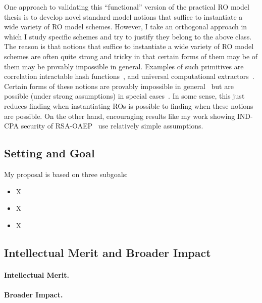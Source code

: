 One approach to validating this ``functional'' version of the practical RO model thesis is to develop novel standard model notions that suffice to instantiate a wide variety of RO model schemes. However, I take an orthogonal approach in which I study  specific  schemes and try to justify they belong to the above class.  The reason is that notions that suffice to instantiate a wide variety of RO model schemes are often quite strong and tricky in that certain forms of them may be of them may be provably impossible in general.  Examples of such primitives are correlation intractable hash functions~\cite{JACM:CanHalGol04}, and universal computational extractors~\cite{C:BelHoaKee13,C:BelHoaKee14}.  Certain forms of these notions are provably impossible in general~\cite{JACM:CanHalGol04, AC:BrzMit14} but are possible (under strong assumptions) in special cases~\cite{EPRINT:BrzMit15,TCC:CanCheRey16,EC:CCRR18}.  In some sense, this just reduces finding when instantiating ROs is possible to finding when these notions are possible.  On the other hand, encouraging results like my work showing IND-CPA security of RSA-OAEP~\cite{EC:BelRog} use relatively simple assumptions. 

\subsection{Setting and Goal} 

  My proposal is based on three subgoals:
 \begin{itemize}
 \item X
 \item X
 \item X
  \end{itemize} 

 
  
 \subsection{Intellectual Merit and Broader Impact}
 
  \paragraph*{Intellectual Merit.}  
 \paragraph*{Broader Impact.} \label{sec-outreach}
 
